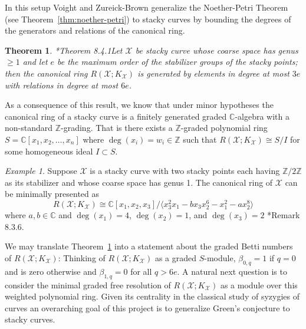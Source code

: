 \documentclass[11pt,reqno]{amsart}
\newtheorem{theorem}[lemma]{Theorem}
\theoremstyle{remark}
\newtheorem{example}[lemma]{Example}
\newcommand{\cX}{\mathcal{X}}
\newcommand{\C}{\mathbb{C}}
\newcommand{\Z}{\mathbb{Z}}
\newcommand{\juliette}[1]{{\color{red} \sf $\spadesuit\spadesuit\spadesuit$ Juliette: [#1]}}
\begin{document}
In this setup Voight and Zureick-Brown generalize the Noether-Petri Theorem (see Theorem~\ref{thm:noether-petri}) to stacky curves by bounding the degrees of the generators and relations of the canonical ring. 


\begin{theorem}\cite{voightZurieckBrown22}*{Theorem 8.4.1}\label{thm:voight-dzb}
Let $\cX$ be stacky curve whose coarse space has genus $\geq 1$ and let $e$ be the maximum order of the stabilizer groups of the stacky points; then the canonical ring $R(\cX; K_{\cX})$ is  generated by elements in degree at most $3e$ with relations in degree at most $6e$. %
\end{theorem}


As a consequence of this result, we know that under minor hypotheses the canonical ring of a stacky curve is a finitely generated graded $\C$-algebra with a non-standard $\Z$-grading. That is there exists a $\Z$-graded polynomial ring $S=\C[x_{1},x_{2},\ldots,x_{n}]$ where $\deg(x_{i})=w_{i}\in\Z$ such that $R(\cX;K_{\cX}) \cong S/I$ for some homogeneous ideal $I\subset S$.

\begin{example}\label{example:canonical-ring}
Suppose $\cX$ is a stacky curve with two stacky points each having $\Z/2\Z$ as its stabilizer and whose coarse space has genus 1. The canonical ring of $\cX$ can be minimally presented as
\[
R(\cX;K_{\cX})\cong \C[x_{1},x_{2},x_{3}]/\langle x_{3}^{2}x_{1}-bx_{3}x_{2}^{6}-x_{1}^{2}-ax_{2}^{8}\rangle
\]
where $a,b\in \C$ and $\deg(x_{1})=4$, $\deg(x_{2})=1$, and $\deg(x_{3})=2$ \cite{voightZurieckBrown22}*{Remark 8.3.6}. 
\end{example}


We may translate Theorem~\ref{thm:voight-dzb} into a statement about the graded Betti numbers of $R(\cX;K_{\cX})$: Thinking of $R(\cX;K_{\cX})$ as a graded $S$-module, $\beta_{0,q}=1$ if $q=0$ and is zero otherwise and $\beta_{1,q}=0$ for all $q>6e$. A natural next question is to consider the minimal graded free resolution of $R(\cX;K_{\cX})$ as a module over this weighted polynomial ring. Given its centrality in the classical study of syzygies of curves an overarching goal of this project is to generalize Green's conjecture to stacky curves.
\end{document}
